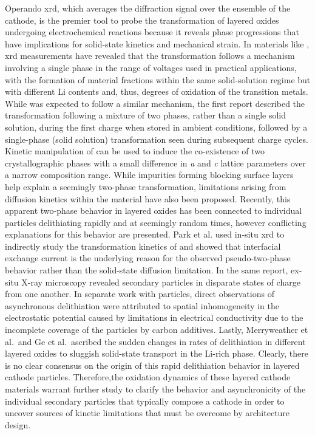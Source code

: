 \documentclass{article}
\begin{document}
Operando \gls{xrd}, which averages the diffraction signal over the
ensemble of the cathode, is the premier tool to probe the
transformation of layered oxides undergoing electrochemical reactions
because it reveals phase progressions that have implications for
solid-state kinetics and mechanical strain.  In \nmc{} materials like
\nmc[333]{}, \gls{xrd} measurements have revealed that the
transformation follows a mechanism involving a single phase in the
range of voltages used in practical
applications,\cite{hulzen2018,ahn2017,zhou2016-2} with the formation
of material fractions within the same solid-solution regime but with
different Li contents and, thus, degrees of oxidation of the
transition metals. While \nca{} was expected to follow a similar
mechanism, the first report described the transformation following a
mixture of two phases, rather than a single solid solution, during the
first charge when stored in ambient conditions, followed by a
single-phase (solid solution) transformation seen during subsequent
charge cycles\cite{robert2015}. Kinetic manipulation of \nmc[333]{}
can be used to induce the co-existence of two crystallographic phases
with a small difference in \emph{a} and \emph{c} lattice parameters
over a narrow composition range\cite{yoon2006,hua2018}. While
impurities forming blocking surface layers help explain a seemingly
two-phase transformation\cite{grenier2017}, limitations arising from
diffusion kinetics within the material have also been
proposed\cite{chapman2020}. Recently, this apparent two-phase behavior
in layered oxides has been connected to individual particles
delithiating rapidly and at seemingly random times\cite{chueh2021,
  zhao2022, rao2021, wang2020-6}, however conflicting explanations for
this behavior are presented. Park et al. \cite{chueh2021} used in-situ
\gls{xrd} to indirectly study the transformation kinetics of
\nmc[333]{} and showed that interfacial exchange current is the
underlying reason for the observed pseudo-two-phase behavior rather
than the solid-state diffusion limitation. In the same report, ex-situ
X-ray microscopy revealed secondary particles in disparate states of
charge from one another. In separate work with \nmc[532]{}
particles,\cite{zhao2022} direct observations of asynchronous
delithiation were attributed to spatial inhomogeneity in the
electrostatic potential caused by limitations in electrical
conductivity due to the incomplete coverage of the particles by carbon
additives. Lastly, Merryweather et al.\cite{rao2021}\ and Ge et
al.\cite{wang2020-6}\ ascribed the sudden changes in rates of
delithiation in different layered oxides to sluggish solid-state
transport in the Li-rich phase. Clearly, there is no clear consensus
on the origin of this rapid delithiation behavior in layered cathode
particles. Therefore,the oxidation dynamics of these layered cathode
materials warrant further study to clarify the behavior and
asynchronicity of the individual secondary particles that typically
compose a cathode in order to uncover sources of kinetic limitations
that must be overcome by architecture design.
\end{document}
